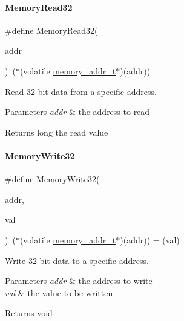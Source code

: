 \paragraph{\texorpdfstring{Memory\+Read32}{MemoryRead32}}
{\footnotesize\ttfamily \#define Memory\+Read32(\begin{DoxyParamCaption}\item[{}]{addr }\end{DoxyParamCaption})~($\ast$(volatile \mbox{\hyperlink{a00020_a06da901348542a481c297d9b700e2001}{memory\+\_\+addr\+\_\+t}}$\ast$)(addr))}



Read 32-\/bit data from a specific address. 


\begin{DoxyParams}{Parameters}
{\em addr} & the address to read \\
\hline
\end{DoxyParams}
\begin{DoxyReturn}{Returns}
long the read value 
\end{DoxyReturn}
\mbox{\label{a00020_a6b9732365b12e48ddb89fe1028b975b0}} 
\paragraph{\texorpdfstring{Memory\+Write32}{MemoryWrite32}}
{\footnotesize\ttfamily \#define Memory\+Write32(\begin{DoxyParamCaption}\item[{}]{addr,  }\item[{}]{val }\end{DoxyParamCaption})~($\ast$(volatile \mbox{\hyperlink{a00020_a06da901348542a481c297d9b700e2001}{memory\+\_\+addr\+\_\+t}}$\ast$)(addr)) = (val)}



Write 32-\/bit data to a specific address. 


\begin{DoxyParams}{Parameters}
{\em addr} & the address to write \\
\hline
{\em val} & the value to be written \\
\hline
\end{DoxyParams}
\begin{DoxyReturn}{Returns}
void 
\end{DoxyReturn}
\mbox{\label{a00020_a8c864ced65734e7f17f208d7b532c251}} 
